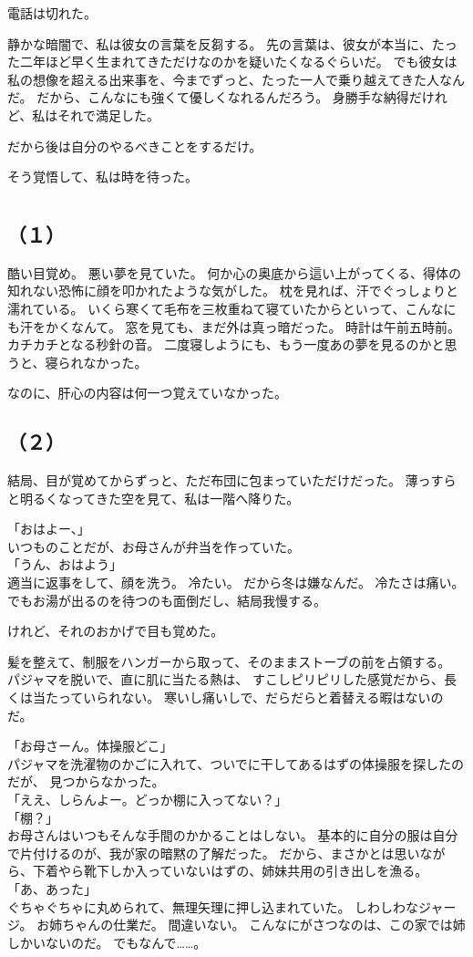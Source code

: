 \documentclass[../IHMain]{subfiles}
\begin{document}
電話は切れた。

静かな暗闇で、私は彼女の言葉を反芻する。
先の言葉は、彼女が本当に、たった二年ほど早く生まれてきただけなのかを疑いたくなるぐらいだ。
でも彼女は私の想像を超える出来事を、今までずっと、たった一人で乗り越えてきた人なんだ。
だから、こんなにも強くて優しくなれるんだろう。
身勝手な納得だけれど、私はそれで満足した。

だから後は自分のやるべきことをするだけ。

そう覚悟して、私は時を待った。

\section{}
\subsection*{\gt \centering（１）}
酷い目覚め。
悪い夢を見ていた。
何か心の奥底から這い上がってくる、得体の知れない恐怖に顔を叩かれたような気がした。
枕を見れば、汗でぐっしょりと濡れている。
いくら寒くて毛布を三枚重ねて寝ていたからといって、こんなにも汗をかくなんて。
窓を見ても、まだ外は真っ暗だった。
時計は午前五時前。
カチカチとなる秒針の音。
二度寝しようにも、もう一度あの夢を見るのかと思うと、寝られなかった。

なのに、肝心の内容は何一つ覚えていなかった。

\subsection*{\gt（２）}
結局、目が覚めてからずっと、ただ布団に包まっていただけだった。
薄っすらと明るくなってきた空を見て、私は一階へ降りた。

「おはよー、」\\
いつものことだが、お母さんが弁当を作っていた。\\
「うん、おはよう」\\
適当に返事をして、顔を洗う。
冷たい。
だから冬は嫌なんだ。
冷たさは痛い。
でもお湯が出るのを待つのも面倒だし、結局我慢する。

けれど、それのおかげで目も覚めた。

髪を整えて、制服をハンガーから取って、そのままストーブの前を占領する。
パジャマを脱いで、直に肌に当たる熱は、
すこしピリピリした感覚だから、長くは当たっていられない。
寒いし痛いしで、だらだらと着替える暇はないのだ。

「お母さーん。体操服どこ」\\
パジャマを洗濯物のかごに入れて、ついでに干してあるはずの体操服を探したのだが、
見つからなかった。\\
「ええ、しらんよー。どっか棚に入ってない？」\\
「棚？」\\
お母さんはいつもそんな手間のかかることはしない。
基本的に自分の服は自分で片付けるのが、我が家の暗黙の了解だった。
だから、まさかとは思いながら、下着やら靴下しか入っていないはずの、姉妹共用の引き出しを漁る。\\
「あ、あった」\\
ぐちゃぐちゃに丸められて、無理矢理に押し込まれていた。
しわしわなジャージ。
お姉ちゃんの仕業だ。
間違いない。
こんなにがさつなのは、この家では姉しかいないのだ。
でもなんで……。
\end{document}
